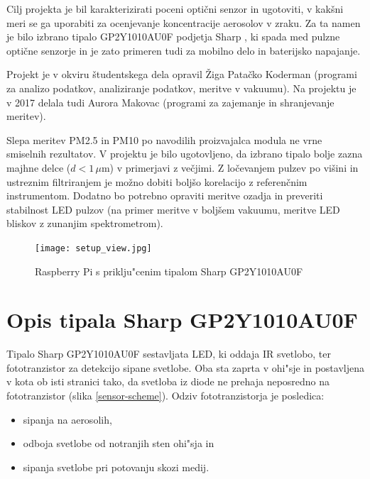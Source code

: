 \documentclass[12pt,a4paper]{article}
\begin{document}
Cilj projekta je bil karakterizirati poceni optični senzor in ugotoviti, v kakšni meri se ga uporabiti za ocenjevanje koncentracije aerosolov v zraku. Za ta namen je bilo izbrano tipalo GP2Y1010AU0F podjetja Sharp \cite{sharp-gp2y1010au0f},
ki spada med pulzne optične senzorje in je zato primeren tudi za mobilno delo in baterijsko napajanje. 

Projekt je v okviru študentskega dela opravil Žiga Patačko Koderman (programi za analizo podatkov, analiziranje podatkov, meritve v vakuumu). Na projektu je v 2017 delala tudi Aurora Makovac (programi za zajemanje in shranjevanje meritev).

 Slepa meritev PM2.5 in PM10 po navodilih proizvajalca modula ne vrne smiselnih rezultatov.
V projektu je bilo ugotovljeno, da izbrano tipalo bolje zazna majhne delce ($d < 1\,\mu$m) v primerjavi z večjimi. Z ločevanjem pulzev po višini in ustreznim filtriranjem je možno dobiti boljšo korelacijo z referenčnim instrumentom. Dodatno bo potrebno opraviti meritve ozadja in preveriti stabilnost LED pulzov (na primer meritve v boljšem vakuumu, meritve LED bliskov z zunanjim spektrometrom). 

\begin{figure}[bh!]
	\begin{center}
		\texttt{[image: setup\_view.jpg]}
		\caption{Raspberry Pi s priklju"cenim tipalom Sharp GP2Y1010AU0F}
		\label{setup-view}
	\end{center}
\end{figure}

\newpage
\section{Opis tipala Sharp GP2Y1010AU0F}

Tipalo Sharp GP2Y1010AU0F \cite{sharp-gp2y1010au0f} sestavljata LED, ki oddaja IR svetlobo, ter fototranzistor za detekcijo sipane svetlobe. Oba sta zaprta v ohi"sje in postavljena v kota ob isti stranici tako, da svetloba iz diode ne prehaja neposredno na fototranzistor (slika \ref{sensor-scheme}). Odziv fototranzistorja je posledica:
\begin{itemize}
	\item sipanja na aerosolih,
	\item odboja svetlobe od notranjih sten ohi"sja in
	\item sipanja svetlobe pri potovanju skozi medij.
\end{itemize}
\end{document}
